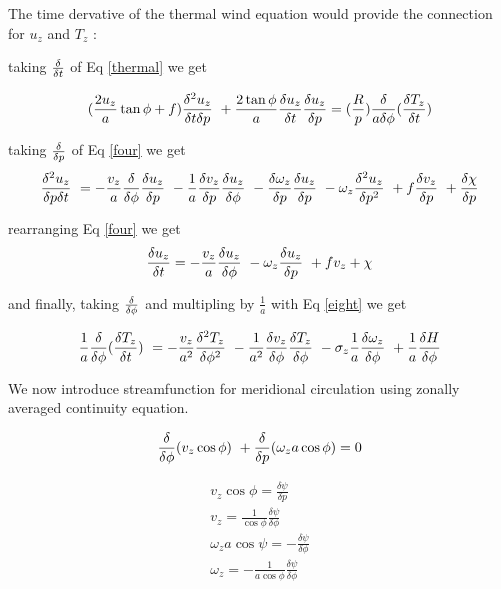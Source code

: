\documentclass{article}
\begin{document}
The time dervative of the thermal wind equation would provide the connection
for $u_z$ and $T_z$ :

taking $\frac{\delta}{\delta t}$ of Eq \ref{thermal} we get

\begin{equation}
(\frac{2 u_z}{a} \tan \phi + f) \frac{\delta^2 u_z}{\delta t \delta p} \
+ \frac{2 \tan \phi}{a} \frac{\delta u_z}{\delta t} \frac{\delta u_z}{\delta p} = (\frac{R}{p}) \frac{\delta}{a \delta \phi} (\frac{\delta T_z}{\delta t})
\label{six}
\end{equation}

taking $\frac{\delta}{\delta p}$ of Eq \ref{four} we get
\begin{equation}
\frac{\delta^2 u_z}{\delta p \delta t } \
= - \frac{v_z}{a} \frac{\delta}{\delta \phi} \frac{\delta u_z}{\delta p} \
- \frac{1}{a} \frac{\delta v_z}{\delta p} \frac{\delta u_z}{\delta \phi} \
- \frac{\delta \omega_z}{\delta p} \frac{\delta u_z}{\delta p} \
- \omega_z \frac{\delta^2 u_z}{\delta p^2} \
+ f \frac{\delta v_z}{\delta p} \
+ \frac{\delta \chi}{\delta p}
\label{seven}
\end{equation}

rearranging Eq \ref{four} we get
\begin{equation}
\frac{\delta u_z}{\delta t} =
- \frac{v_z}{a} \frac{\delta u_z}{\delta \phi} \
- \omega_z \frac{\delta u_z}{\delta p} \
+ fv_z + \chi
\label{eight}
\end{equation}

and finally, taking $\frac{\delta}{\delta \phi}$ and multipling by $\frac{1}{a}$ with Eq
\ref{eight} we get

\begin{equation}
\frac{1}{a} \frac{\delta}{\delta \phi} (\frac{\delta T_z}{\delta t}) \
= - \frac{v_z}{a^2} \frac{\delta^2 T_z}{\delta \phi^2} \
- \frac{1}{a^2} \frac{\delta v_z}{\delta \phi} \frac{\delta T_z}{\delta \phi} \
- \sigma_z \frac{1}{a} \frac{\delta \omega_z}{\delta \phi} \
+ \frac{1}{a} \frac{\delta H}{\delta \phi}
\label{nine}
\end{equation}

We now introduce streamfunction for meridional circulation using zonally
averaged continuity equation.

\begin{equation}
\frac{\delta}{\delta \phi} (v_z \cos{\phi}) \
+ \frac{\delta}{\delta p} (\omega_z a \cos \phi) = 0
\end{equation}

\begin{eqnarray}
v_z \cos \phi = \frac{\delta \psi}{\delta p}
\nonumber\\
v_z = \frac{1}{\cos \phi} \frac{\delta \psi}{\delta \phi}
\nonumber\\
\omega_z a \cos {\psi} = - \frac{\delta \psi}{\delta \phi}
\nonumber\\
\omega_z = - \frac{1}{a \cos \phi} \frac{\delta \psi}{\delta \phi}
\label{ten}
\end{eqnarray}
\end{document}
